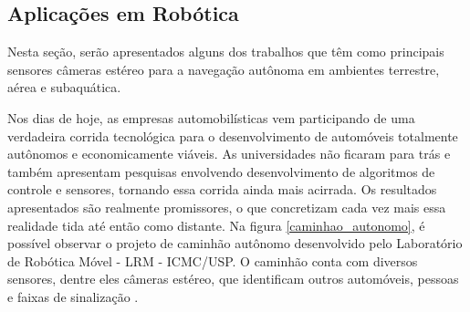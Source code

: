 




\subsection{Aplicações em Robótica}
\label{aplicacoes_robotica}
Nesta seção, serão apresentados alguns dos trabalhos que têm como principais sensores câmeras estéreo para a navegação autônoma em ambientes terrestre, aérea e subaquática.

Nos dias de hoje, as empresas automobilísticas vem participando de uma verdadeira corrida tecnológica para o desenvolvimento de automóveis totalmente autônomos e economicamente viáveis. As universidades não ficaram para trás e também apresentam pesquisas envolvendo desenvolvimento de algoritmos de controle e sensores, tornando essa corrida ainda mais acirrada. Os resultados apresentados são realmente promissores, o que concretizam cada vez mais essa realidade tida até então como distante. Na figura \ref{caminhao_autonomo}, é possível observar o projeto de caminhão autônomo desenvolvido pelo Laboratório de Robótica Móvel - LRM - ICMC/USP. O caminhão conta com diversos sensores, dentre eles câmeras estéreo, que identificam outros automóveis, pessoas e faixas de sinalização \cite{ShinzatoP}. 

